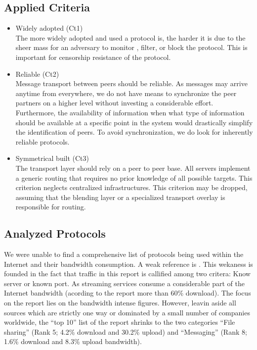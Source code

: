 \subsection{Applied Criteria}
\begin{itemize}
	\item Widely adopted (Ct1)\\
	The more widely adopted and used a protocol is, the harder it is due to the sheer mass for an adversary to monitor , filter, or block the protocol. This is important for censorship resistance of the protocol. 
	\item Reliable (Ct2)\\
	Message transport between peers should be reliable. As messages may arrive anytime from everywhere, we do not have means to synchronize the peer partners on a higher level without investing a considerable effort. Furthermore, the availability of information when what type of information should be available at a specific point in the system would drastically simplify the identification of peers. To avoid synchronization, we do look for inherently reliable protocols.
	\item Symmetrical built (Ct3)\\
	The transport layer should rely on a peer to peer base. All servers implement a generic routing that requires no prior knowledge of all possible targets. This criterion neglects centralized infrastructures. This criterion may be dropped, assuming that the blending layer or a specialized transport overlay is responsible for routing.
\end{itemize}

\subsection{Analyzed Protocols}
We were unable to find a comprehensive list of protocols being used within the Internet and their bandwidth consumption. A weak reference is \cite{zhou2011examining}. This wekaness is founded in the fact that traffic in this report is callified among two critera: Know server or known port. As streaming services consume a considerable part of the Internet bandwidth (acording to the report more than 60\% download). The focus on the report lies on the bandwidth intense figures. However, leavin aside all sources which are strictly one way or dominated by a small number of companies worldwide, the ``top 10'' list of the report shrinks to the two categories ``File sharing'' (Rank 5; 4.2\% download and 30.2\% upload) and ``Messaging'' (Rank 8; 1.6\% download and 8.3\% upload bandwidth). 

